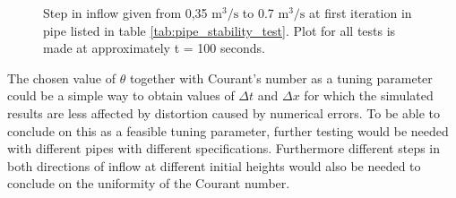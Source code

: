 \begin{figure}[H]
 \centering
 
\caption{Step in inflow given from 0,35 $\text{m}^\text{3}/ \text{s}$ to 0.7 $\text{m}^\text{3}/ \text{s}$ at first iteration in pipe listed in table \ref{tab:pipe_stability_test}. Plot for all tests is made at approximately t = 100 seconds.}
\label{fig:stability_test_theta_0_65}
\end{figure}

The chosen value of $\theta$ together with Courant's number as a tuning parameter could be a simple way to obtain values of $\Delta t$ and $\Delta x$ for which the simulated results are less affected by distortion caused by numerical errors. To be able to conclude on this as a feasible tuning parameter, further testing would be needed with different pipes with different specifications. Furthermore different steps in both directions of inflow at different initial heights would also be needed to conclude on the uniformity of the Courant number. 


